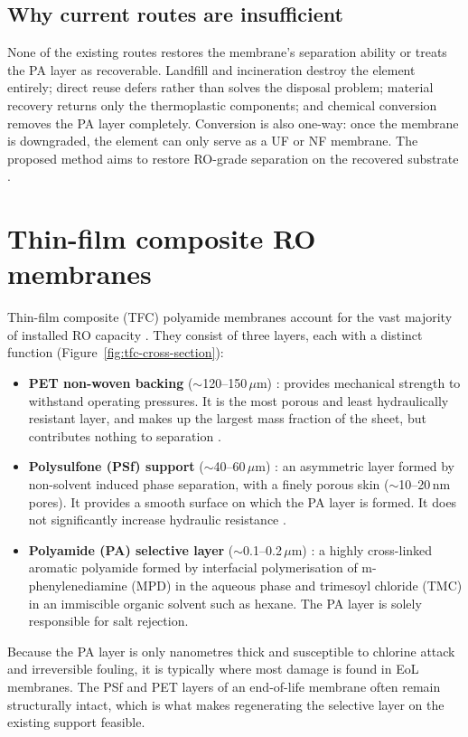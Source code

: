\subsection{Why current routes are insufficient}
None of the existing routes restores the membrane's separation ability or treats the PA layer as recoverable. Landfill and incineration destroy the element entirely; direct reuse defers rather than solves the disposal problem; material recovery returns only the thermoplastic components; and chemical conversion removes the PA layer completely. Conversion is also one-way: once the membrane is downgraded, the element can only serve as a UF or NF membrane. The proposed method aims to restore RO-grade separation on the recovered substrate \citep{Ogbe2026,Ogbe2025}.

\section{Thin-film composite RO membranes}
\label{sec:tfc-anatomy}

Thin-film composite (TFC) polyamide membranes account for the vast majority of installed RO capacity \citep{Geise2010}. They consist of three layers, each with a distinct function (Figure~\ref{fig:tfc-cross-section}):
\begin{itemize}
    \item \textbf{PET non-woven backing} ($\sim$120--150\,$\mu$m) \citep{LejarazuLarranaga2022}: provides mechanical strength to withstand operating pressures. It is the most porous and least hydraulically resistant layer, and makes up the largest mass fraction of the sheet, but contributes nothing to separation \citep{Lawler2015}.
    \item \textbf{Polysulfone (PSf) support} ($\sim$40--60\,$\mu$m) \citep{LejarazuLarranaga2022}: an asymmetric layer formed by non-solvent induced phase separation, with a finely porous skin ($\sim$10--20\,nm pores). It provides a smooth surface on which the PA layer is formed. It does not significantly increase hydraulic resistance \citep{Petersen1993}.
    \item \textbf{Polyamide (PA) selective layer} ($\sim$0.1--0.2\,$\mu$m) \citep{LejarazuLarranaga2022}: a highly cross-linked aromatic polyamide formed by interfacial polymerisation of m-phenylenediamine (MPD) in the aqueous phase and trimesoyl chloride (TMC) in an immiscible organic solvent such as hexane. The PA layer is solely responsible for salt rejection.
\end{itemize}
Because the PA layer is only nanometres thick and susceptible to chlorine attack and irreversible fouling, it is typically where most damage is found in EoL membranes. The PSf and PET layers of an end-of-life membrane often remain structurally intact, which is what makes regenerating the selective layer on the existing support feasible.


